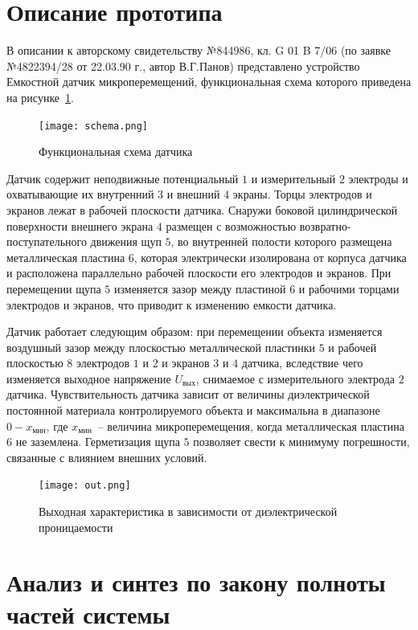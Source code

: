 \section{Описание прототипа}\label{prototype}

В описании к авторскому свидетельству №844986, кл. G 01 B 7/06 (по заявке №4822394/28 от 22.03.90 г., автор В.Г.Панов) представлено устройство \glqq Емкостной датчик микроперемещений\grqq, функциональная схема которого приведена на рисунке~\ref{schema}.

\begin{figure}[h]
	\centering
	\texttt{[image: schema.png]}
	\caption{Функциональная схема датчика}
	\label{schema}
\end{figure}

Датчик содержит неподвижные потенциальный $1$ и измерительный $2$ электроды и охватывающие их внутренний $3$ и внешний $4$ экраны. Торцы электродов и экранов лежат в рабочей плоскости датчика. Снаружи боковой цилиндрической поверхности внешнего экрана $4$ размещен с возможностью возвратно- поступательного движения щуп $5$, во внутренней полости которого размещена металлическая пластина $6$, которая электрически изолирована от корпуса датчика и расположена параллельно рабочей плоскости его электродов и экранов. При перемещении щупа $5$ изменяется зазор между пластиной $6$ и рабочими торцами электродов и экранов, что приводит к изменению емкости датчика.

Датчик работает следующим образом: при перемещении объекта изменяется воздушный зазор между плоскостью металлической пластинки $5$ и рабочей плоскостью $8$ 
электродов $1$ и $2$ и экранов $3$ и $4$ датчика, вследствие чего изменяется выходное напряжение $U_{\text{вых}}$, снимаемое с измерительного электрода $2$ датчика. Чувствительность датчика зависит от величины диэлектрической постоянной материала контролируемого объекта и максимальна в диапазоне $0 - x_{\text{мин}}$, где $x_{\text{мин}}$~-- величина микроперемещения, когда металлическая пластина $6$ не заземлена. Герметизация щупа $5$ позволяет свести к минимуму погрешности, связанные с влиянием внешних условий.


\begin{figure}[h]
	\centering
	\texttt{[image: out.png]}
	\caption{Выходная характеристика в зависимости от диэлектрической проницаемости}
	\label{out}
\end{figure}


\section{Анализ и синтез по закону полноты частей системы}

